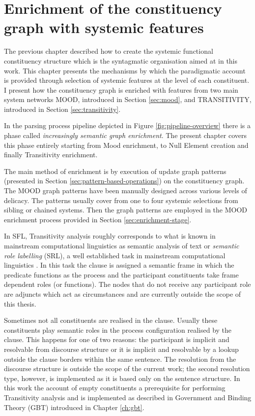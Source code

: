 \chapter{Enrichment of the constituency graph with systemic features}
\label{ch:enrichment-stage}

    The previous chapter described how to create the systemic functional constituency structure which is the syntagmatic organisation aimed at in this work. This chapter presents the mechanisms by which the paradigmatic account is provided through selection of systemic features at the level of each constituent. I present how the constituency graph is enriched with features from two main system networks MOOD, introduced in Section \ref{sec:mood}, and TRANSITIVITY, introduced in Section \ref{sec:transitivity}.

    In the parsing process pipeline depicted in Figure \ref{fig:pipeline-overview} there is a phase called \textit{increasingly semantic graph enrichment}. The present chapter covers this phase entirely starting from Mood enrichment, to Null Element creation and finally Transitivity enrichment.

    The main method of enrichment is by execution of update graph patterns (presented in Section \ref{sec:pattern-based-operations}) on the constituency graph. The MOOD graph patterns have been manually designed across various levels of delicacy. The patterns usually cover from one to four systemic selections from sibling or chained systems. Then the graph patterns are employed in the MOOD enrichment process provided  in Section \ref{sec:enrichment-stage}. 

    In SFL, Transitivity analysis roughly corresponds to what is known in mainstream computational linguistics as semantic analysis of text or \textit{semantic role labelling} (SRL), a well established task in mainstream computational linguistics \citep{Carreras2005, Pradhan2007}. In this task the clause is assigned a semantic frame in which the predicate functions as the process and the participant constituents take frame dependent roles (or functions). The nodes that do not receive any participant role are adjuncts which act as circumstances and are currently outside the scope of this thesis.

    Sometimes not all constituents are realised in the clause. Usually these constituents play semantic roles in the process configuration realised by the clause. This happens for one of two reasons: the participant is implicit and resolvable from discourse structure or it is implicit and resolvable by a lookup outside the clause borders within the same sentence. The resolution from the discourse structure is outside the scope of the current work; the second resolution type, however, is implemented as it is based only on the sentence structure. In this work the account of empty constituents a prerequisite for performing Transitivity analysis and is implemented as described in Government and Binding Theory (GBT) \citep{Haegeman1991} introduced in Chapter \ref{ch:gbt}.

